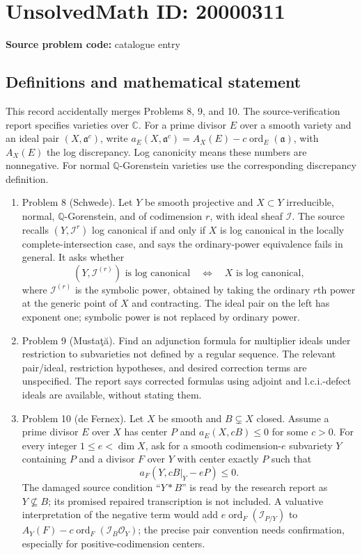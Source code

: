 \documentclass[11pt]{article}
\newcommand{\Q}{\mathbb{Q}}
\newcommand{\C}{\mathbb{C}}
\begin{document}
\section*{UnsolvedMath ID: 20000311}
\textbf{Source problem code:} catalogue entry
\subsection{Definitions and mathematical statement}
This record accidentally merges Problems 8, 9, and 10. The source-verification report specifies varieties over $\C$. For a prime divisor $E$ over a smooth variety and an ideal pair $(X,\mathfrak a^c)$, write $a_E(X,\mathfrak a^c)=A_X(E)-c\operatorname{ord}_E(\mathfrak a)$, with $A_X(E)$ the log discrepancy. Log canonicity means these numbers are nonnegative. For normal $\Q$-Gorenstein varieties use the corresponding discrepancy definition.

\begin{enumerate}
\item Problem 8 (Schwede). Let $Y$ be smooth projective and $X\subset Y$ irreducible, normal, $\Q$-Gorenstein, and of codimension $r$, with ideal sheaf $\mathcal I$. The source recalls $(Y,\mathcal I^r)$ log canonical if and only if $X$ is log canonical in the locally complete-intersection case, and says the ordinary-power equivalence fails in general. It asks whether
\[
 (Y,\mathcal I^{(r)})\text{ is log canonical}
 \quad\Longleftrightarrow\quad X\text{ is log canonical},
\]
where $\mathcal I^{(r)}$ is the symbolic power, obtained by taking the ordinary $r$th power at the generic point of $X$ and contracting. The ideal pair on the left has exponent one; symbolic power is not replaced by ordinary power.
\item Problem 9 (Musta\c t\u a). Find an adjunction formula for multiplier ideals under restriction to subvarieties not defined by a regular sequence. The relevant pair/ideal, restriction hypotheses, and desired correction terms are unspecified. The report says corrected formulas using adjoint and l.c.i.-defect ideals are available, without stating them.
\item Problem 10 (de Fernex). Let $X$ be smooth and $B\subsetneq X$ closed. Assume a prime divisor $E$ over $X$ has center $P$ and $a_E(X,cB)\leq0$ for some $c>0$. For every integer $1\leq e<\dim X$, ask for a smooth codimension-$e$ subvariety $Y$ containing $P$ and a divisor $F$ over $Y$ with center exactly $P$ such that
\[
 a_F(Y,cB|_Y-eP)\leq0.
\]
The damaged source condition ``$Y*B$'' is read by the research report as $Y\not\subseteq B$; its promised repaired transcription is not included. A valuative interpretation of the negative term would add $e\operatorname{ord}_F(\mathcal I_{P/Y})$ to $A_Y(F)-c\operatorname{ord}_F(\mathcal I_B\mathcal O_Y)$; the precise pair convention needs confirmation, especially for positive-codimension centers.
\end{enumerate}
\end{document}
